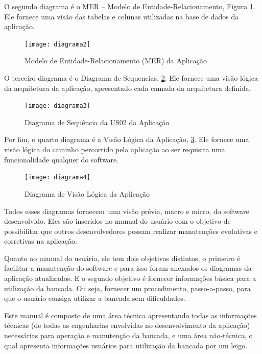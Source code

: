 		O segundo diagrama é o MER – Modelo de Entidade-Relacionamento, Figura \ref{diagrama2}. Ele fornece uma visão das tabelas e colunas utilizadas na base de dados da aplicação.

		\begin{figure}[htpb]
			\centering
			\texttt{[image: diagrama2]}
			\caption{Modelo de Entidade-Relacionamento (MER) da Aplicação}
			\label{diagrama2}
		\end{figure}

		\newpage
		O terceiro diagrama é o Diagrama de Sequencias, \ref{diagrama3}. Ele fornece uma visão lógica da arquitetura da aplicação, apresentado cada camada da arquitetura definida.

		\begin{figure}[htpb]
			\centering
			\texttt{[image: diagrama3]}
			\caption{Diagrama de Sequência da US02 da Aplicação}
			\label{diagrama3}
		\end{figure}

		\newpage
		Por fim, o quarto diagrama é a Visão Lógica da Aplicação, \ref{diagrama4}. Ele fornece uma visão lógica do caminho percorrido pela aplicação ao ser requisita uma funcionalidade qualquer do software.

		\begin{figure}[htpb]
			\centering
			\texttt{[image: diagrama4]}
			\caption{Diagrama de Visão Lógica da Aplicação}
			\label{diagrama4}
		\end{figure}		

		Todos esses diagramas fornecem uma visão prévia, macro e micro, do software desenvolvido. Eles são inseridos no manual do usuário com o objetivo de possibilitar que outros desenvolvedores possam realizar manutenções evolutivas e corretivas na aplicação.
		
		Quanto ao manual do usuário, ele tem dois objetivos distintos, o primeiro é facilitar a manutenção do software e para isso foram anexados os diagramas da aplicação atualizados. E o segundo objetivo é fornecer informações básica para a utilização da bancada. Ou seja, fornecer um procedimento, passo-a-passo, para que o usuário consiga utilizar a bancada sem dificuldades.
		
		Este manual é composto de uma área técnica apresentando todas as informações técnicas (de todas as engenharias envolvidas no desenvolvimento da aplicação) necessárias para operação e manutenção da bancada, e uma área não-técnica, o qual apresenta informações usuários para utilização da bancada por um leigo.
		

